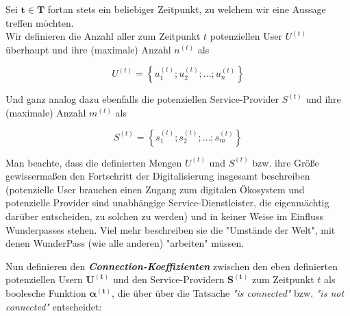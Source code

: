 Sei $\mathbf{t \in T}$ fortan stets ein beliebiger Zeitpunkt, zu welchem wir eine Aussage treffen möchten. \\


Wir definieren die Anzahl aller zum Zeitpunkt $t$ potenziellen User $U^{(t)}$ überhaupt und ihre (maximale) Anzahl $n^{(t)}$ als \\

\begin{Def}\label{defU}
\begin{equation*}
  U^{(t)} = \left\{ u^{(t)}_1; u^{(t)}_2;...; u^{(t)}_{n} \right\}
\end{equation*}
\end{Def} 

\vspace{0.3cm}


Und ganz analog dazu ebenfalls die potenziellen Service-Provider $S^{(t)}$ und ihre (maximale) Anzahl $m^{(t)}$ als \\

\begin{Def}\label{defS}
\begin{equation*}
  S^{(t)} = \left\{ s^{(t)}_1; s^{(t)}_2;...; s^{(t)}_{m}\right\}
\end{equation*}
\end{Def}

\vspace{0.3cm}

Man beachte, dass die definierten Mengen $U^{(t)}$ und $S^{(t)}$ bzw. ihre Größe gewissermaßen den Fortschritt der Digitalisierung insgesamt beschreiben (potenzielle User brauchen einen Zugang zum digitalen Ökosystem und potenzielle Provider sind unabhängige Service-Dienstleister, die eigenmächtig darüber entscheiden, zu solchen zu werden) und in keiner Weise im Einfluss Wunderpasses stehen. Viel mehr beschreiben sie die "Umstände der Welt", mit denen WunderPass (wie alle anderen) "arbeiten" müssen.  

\vspace{0.6cm}


Nun definieren den \textbf{\textit{Connection-Koeffizienten}} zwischen den eben definierten potenziellen Usern $\mathbf{U^{(t)}}$ und den Service-Providern $\mathbf{S^{(t)}}$ zum Zeitpunkt $t$ als boolesche Funktion $\mathbf{\alpha^{(t)}}$, die über über die Tatsache \textit{"is connected"} bzw. \textit{"is not connected"} entscheidet: \\

